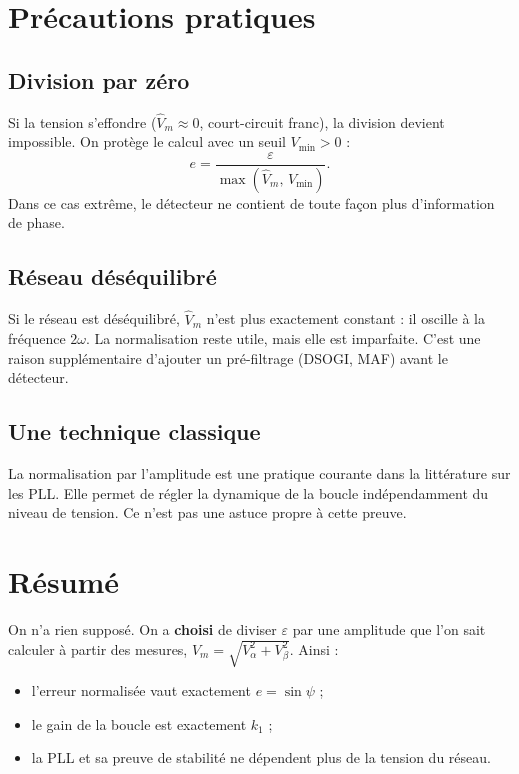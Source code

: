 \documentclass[11pt,a4paper]{article}
\numberwithin{equation}{section}
\begin{document}
\section{Précautions pratiques}

\subsection{Division par zéro}
Si la tension s'effondre ($\hat V_m\approx0$, court-circuit franc), la division devient impossible.
On protège le calcul avec un seuil $V_{\min}>0$ :
\begin{equation}
e = \frac{\varepsilon}{\max\left(\hat V_m,\,V_{\min}\right)} .
\end{equation}
Dans ce cas extrême, le détecteur ne contient de toute façon plus d'information de phase.

\subsection{Réseau déséquilibré}
Si le réseau est déséquilibré, $\hat V_m$ n'est plus exactement constant : il oscille à la fréquence $2\omega$.
La normalisation reste utile, mais elle est imparfaite. C'est une raison supplémentaire d'ajouter un
pré-filtrage (DSOGI, MAF) avant le détecteur.

\subsection{Une technique classique}
La normalisation par l'amplitude est une pratique courante dans la littérature sur les PLL.
Elle permet de régler la dynamique de la boucle indépendamment du niveau de tension.
Ce n'est pas une astuce propre à cette preuve.

\section{Résumé}

\begin{resultat}
On n'a rien supposé. On a \textbf{choisi} de diviser $\varepsilon$ par une amplitude que l'on sait calculer
à partir des mesures, $\hat V_m=\sqrt{V_\alpha^2+V_\beta^2}$. Ainsi :
\begin{itemize}
  \item l'erreur normalisée vaut exactement $e=\sin\psi$ ;
  \item le gain de la boucle est exactement $k_1$ ;
  \item la PLL et sa preuve de stabilité ne dépendent plus de la tension du réseau.
\end{itemize}
\end{resultat}
\end{document}
